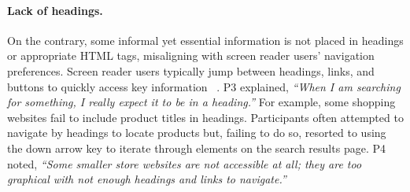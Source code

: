 \paragraph{\textbf{Lack of headings.}}
On the contrary, some informal yet essential information is not placed in headings or appropriate HTML tags, misaligning with screen reader users' navigation preferences. Screen reader users typically jump between headings, links, and buttons to quickly access key information ~\cite{yu2023design,webaim_screen_reader_survey_10}. P3 explained, \textit{``When I am searching for something, I really expect it to be in a heading.''} For example, some shopping websites fail to include product titles in headings. Participants often attempted to navigate by headings to locate products but, failing to do so, resorted to using the down arrow key to iterate through elements on the search results page. P4 noted, \textit{``Some smaller store websites are not accessible at all; they are too graphical with not enough headings and links to navigate.''}



